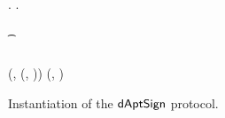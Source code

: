 \begin{figure}
\begin{center}
{\begin{varwidth}{\textwidth}
{            \varPubKey \opFunResult \varSigContext.\varPubKey \< \< \varPubKey \opFunResult \varSigContext.\varPubKey \\
            \pcif \procVerf{\varMsg}{\varSigFin}{\varPubKey}  \\
            \t \pcreturn \cnstFalsum \\
            \varWit \opFunResult \procExtWit{\varSigFin}{\varSigAlice}{\varSigAptBob} \\
            \pcreturn (\varWit, (\varSigFin, \varPubKey)) \< \< \pcreturn (\varSigFin, \varPubKey)
            }
        \end{varwidth}
        }
    \end{center}
    \caption{Instantiation of the $\mathsf{dAptSign}$ protocol.} \label{fig:sig:daptsign}
\end{figure}
